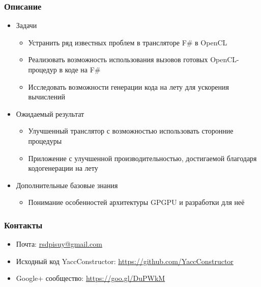 \documentclass{beamer}
\begin{document}
\begin{frame}[fragile]
\transwipe[direction=90]
\frametitle{Описание}
\begin{itemize}
\item Задачи
\begin{itemize}
  \item Устранить ряд известных проблем в трансляторе F\# в OpenCL
  \item Реализовать возможность использования вызовов готовых OpenCL-процедур в коде на F\#
  \item Исследовать возможности генерации кода на лету для ускорения вычислений
\end{itemize}
\item Ожидаемый результат
\begin{itemize}
\item Улучшенный транслятор с возможностью использовать сторонние процедуры
\item Приложение с улучшенной производительностью, достигаемой благодаря кодогенерации на лету
\end{itemize}
\item Дополнительные базовые знания
\begin{itemize}
\item Понимание особенностей архитектуры GPGPU и разработки для неё
\end{itemize}
\end{itemize}
\end{frame}
            
\begin{frame}
\transwipe[direction=90]
\frametitle{Контакты}
\begin{itemize}
  \item Почта: \url{rsdpisuy@gmail.com}
  \item Исходный код YaccConstructor: \url{https://github.com/YaccConstructor}
  \item Google+ сообщество: \url{https://goo.gl/DuPWkM}
\end{itemize}
\end{frame}
\end{document}
